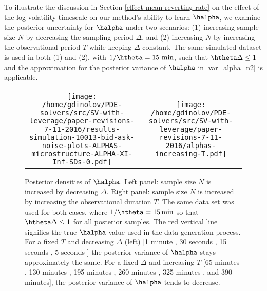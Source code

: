 To illustrate the discussion in Section \ref{effect-mean-reverting-rate} on the effect of the log-volatility timescale on our method's ability to learn $\halpha$, we examine the posterior uncertainty for $\halpha$ under two scenarios: (1) increasing sample size $N$ by decreasing the sampling period $\Delta$, and (2) increasing $N$ by increasing the observational period $T$ while keeping $\Delta$ constant. The same simulated dataset is used in both (1) and (2), with $1/\htheta = 15 \mbox{ min}$, such that $\htheta \Delta \leq 1$ and the approximation for the posterior variance of $\halpha$ in \eqref{var_alpha_n2} is applicable.
\begin{figure}[h!]
\centering
\begin{tabular}{cc}
			\begin{minipage}{0.45\textwidth}
				\centering
				\texttt{[image: /home/gdinolov/PDE-solvers/src/SV-with-leverage/paper-revisions-7-11-2016/results-simulation-10013-bid-ask-noise-plots-ALPHAS-microstructure-ALPHA-XI-Inf-SDs-0.pdf]}
			\end{minipage}
			& \begin{minipage}{0.45\textwidth}
				\centering
				\texttt{[image: /home/gdinolov/PDE-solvers/src/SV-with-leverage/paper-revisions-7-11-2016/alphas-increasing-T.pdf]}
				\end{minipage}
\end{tabular}
\caption{Posterior densities of $\halpha$. Left panel: sample size $N$ is increased by decreasing $\Delta$. Right panel: sample size $N$ is increased by increasing the observational duration $T$. The same data set was used for both cases, where $1/\htheta = 15\, \mbox{min}$ so that $\htheta \Delta \leq 1$ for all posterior samples. The red vertical line signifies the true $\halpha$ value used in the data-generation process. For a fixed $T$ and decreasing $\Delta$ (left) [1 minute \usebox{\legendLineOne}, 30 seconds \usebox{\legendLineTwo}, 15 seconds \usebox{\legendLineThree}, 5 seconds \usebox{\legendLineFour}] the posterior variance of $\halpha$ stays approximately the same. For a fixed $\Delta$ and increasing $T$ [65 minutes \usebox{\legendLineOne}, 130 minutes \usebox{\legendLineTwo}, 195 minutes \usebox{\legendLineThree}, 260 minutes \usebox{\legendLineFour}, 325 minutes \usebox{\legendLineFive}, and 390 \usebox{\legendLineTwo} minutes], the posterior variance of $\halpha$ tends to decrease.}\label{fig:different-phi}
\end{figure}

